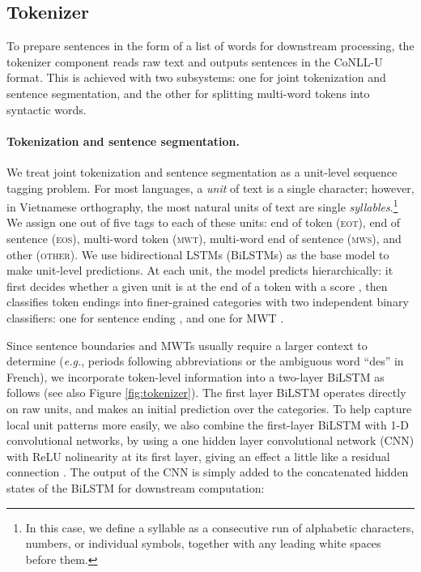 \documentclass[11pt,a4paper]{article}
\newcommand{\conllu}{CoNLL-U}
\begin{document}
\subsection{Tokenizer} \label{sec:tok}

To prepare sentences in the form of a list of words for downstream processing, the tokenizer component reads raw text and outputs sentences in the \conllu{} format.
This is achieved with two subsystems: one for joint tokenization and sentence segmentation, and the other for splitting multi-word tokens into syntactic words. 

\paragraph{Tokenization and sentence segmentation.} We treat joint tokenization and sentence segmentation as a unit-level sequence tagging problem.
For most languages, a \emph{unit} of text is a single character; however, in Vietnamese orthography, the most natural units of text are single \emph{syllables}.\footnote{In this case, we define a syllable as a consecutive run of alphabetic characters, numbers, or individual symbols, together with any leading white spaces before them.}
We assign one out of five tags to each of these units: end of token (\textsc{eot}), end of sentence (\textsc{eos}), multi-word token (\textsc{mwt}), multi-word end of sentence (\textsc{mws}), and other (\textsc{other}).
We use bidirectional LSTMs (BiLSTMs) as the base model to make unit-level predictions.
At each unit, the model predicts hierarchically: it first decides whether a given unit is at the end of a token with a score , then classifies token endings into finer-grained categories with two independent binary classifiers: one for sentence ending , and one for MWT .

Since sentence boundaries and MWTs usually require a larger context to determine (\emph{e.g.}, periods following abbreviations or the ambiguous word ``des'' in French), we incorporate token-level information into a two-layer BiLSTM as follows (see also Figure \ref{fig:tokenizer}). The first layer BiLSTM operates directly on raw units, and makes an initial prediction over the categories.
To help capture local unit patterns more easily, we also combine the first-layer BiLSTM with 1-D convolutional networks, by using a one hidden layer convolutional network (CNN) with ReLU nolinearity at its first layer, giving an effect a little like a residual connection \cite{he2016residual}.
The output of the CNN is simply added to the concatenated hidden states of the BiLSTM for downstream computation:
\end{document}
